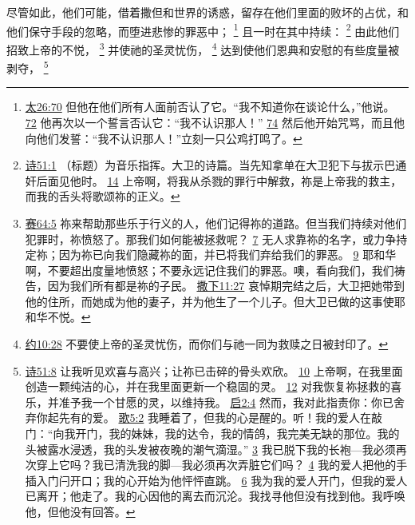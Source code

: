 \documentclass[12pt, a4paper, oneside]{ctexart}
\newcounter{parnum}[section]
\newcommand{\N}{%
   \noindent\refstepcounter{parnum}%
    \makebox[\parindent][l]{\textbf{\arabic{parnum}.}}}
\begin{document}
\N 尽管如此，他们可能，借着撒但和世界的诱惑，留存在他们里面的败坏的占优，和他们保守手段的忽略，而堕进悲惨的罪恶中；
	\footnote {
		\href{https://biblehub.com/matthew/26-70.htm}{太26:70} 但他在他们所有人面前否认了它。“我不知道你在谈论什么，”他说。
		\href{https://biblehub.com/matthew/26-72.htm}{72} 他再次以一个誓言否认它：“我不认识那人！”
		\href{https://biblehub.com/matthew/26-74.htm}{74} 然后他开始咒骂，而且他向他们发誓：“我不认识那人！”立刻一只公鸡打鸣了。
	}
	且一时在其中持续：
	\footnote {
		\href{https://biblehub.com/psalms/51-1.htm}{诗51:1} （标题）为音乐指挥。大卫的诗篇。当先知拿单在大卫犯下与拔示巴通奸后面见他时。
		\href{https://biblehub.com/psalms/51-14.htm}{14} 上帝啊，将我从杀戮的罪行中解救，祢是上帝我的救主，而我的舌头将歌颂祢的正义。
	}
	由此他们招致上帝的不悦，
	\footnote {
		\href{https://biblehub.com/isaiah/64-5.htm}{赛64:5} 祢来帮助那些乐于行义的人，他们记得祢的道路。但当我们持续对他们犯罪时，祢愤怒了。那我们如何能被拯救呢？
		\href{https://biblehub.com/isaiah/64-7.htm}{7} 无人求靠祢的名字，或力争持定祢；因为祢已向我们隐藏祢的面，并已将我们弃给我们的罪恶。
		\href{https://biblehub.com/isaiah/64-9.htm}{9} 耶和华啊，不要超出度量地愤怒；不要永远记住我们的罪恶。噢，看向我们，我们祷告，因为我们所有都是祢的子民。
		\href{https://biblehub.com/2_samuel/11-27.htm}{撒下11:27} 哀悼期完结之后，大卫把她带到他的住所，而她成为他的妻子，并为他生了一个儿子。但大卫已做的这事使耶和华不悦。
	}
	并使祂的圣灵忧伤，
	\footnote {
		\href{https://biblehub.com/ephesians/4-30.htm}{约10:28} 不要使上帝的圣灵忧伤，而你们与祂一同为救赎之日被封印了。
	}
	达到使他们恩典和安慰的有些度量被剥夺，
	\footnote {
		\href{https://biblehub.com/psalms/51-8.htm}{诗51:8} 让我听见欢喜与高兴；让祢已击碎的骨头欢欣。
		\href{https://biblehub.com/psalms/51-10.htm}{10} 上帝啊，在我里面创造一颗纯洁的心，并在我里面更新一个稳固的灵。
		\href{https://biblehub.com/psalms/51-12.htm}{12} 对我恢复祢拯救的喜乐，并准予我一个甘愿的灵，以维持我。
		\href{https://biblehub.com/revelation/2-4.htm}{启2:4} 然而，我对此指责你：你已舍弃你起先有的爱。
		\href{https://biblehub.com/songs/5-2.htm}{歌5:2} 我睡着了，但我的心是醒的。听！我的爱人在敲门：“向我开门，我的妹妹，我的达令，我的情鸽，我完美无缺的那位。我的头被露水浸透，我的头发被夜晚的潮气滴湿。”
		\href{https://biblehub.com/songs/5-3.htm}{3} 我已脱下我的长袍---我必须再次穿上它吗？我已清洗我的脚---我必须再次弄脏它们吗？
		\href{https://biblehub.com/songs/5-4.htm}{4} 我的爱人把他的手插入门闩开口；我的心开始为他怦怦直跳。
		\href{https://biblehub.com/songs/5-6.htm}{6} 我为我的爱人开门，但我的爱人已离开；他走了。我的心因他的离去而沉沦。我找寻他但没有找到他。我呼唤他，但他没有回答。
	}
\end{document}
